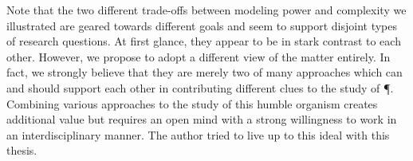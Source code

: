 	Note that the two different trade-offs between modeling power and complexity we illustrated are geared towards different goals and seem to support disjoint types of research questions. At first glance, they appear to be in stark contrast to each other. However, we propose to adopt a different view of the matter entirely. In fact, we strongly believe that they are merely two of many approaches which can and should support each other in contributing different clues to the study of \P. Combining various approaches to the study of this humble organism creates additional value but requires an open mind with a strong willingness to work in an interdisciplinary manner. The author tried to live up to this ideal with this thesis.

